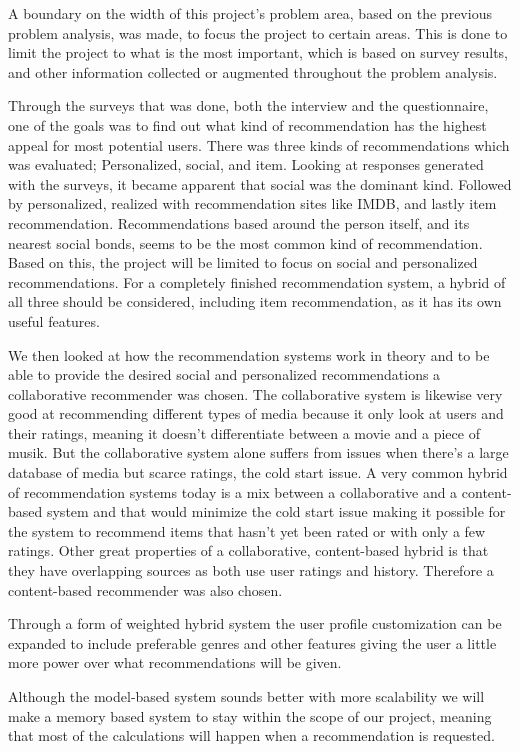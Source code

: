 A boundary on the width of this project's problem area, based on the previous problem analysis, was made, to focus the project to certain areas. This is done to limit the project to what is the most important, which is based on survey results, and other information collected or augmented throughout the problem analysis.

Through the surveys that was done, both the interview and the questionnaire, one of the goals was to find out what kind of recommendation has the highest appeal for most potential users. There was three kinds of recommendations which was evaluated; Personalized, social, and item. Looking at responses generated with the surveys, it became apparent that social was the dominant kind. Followed by personalized, realized with recommendation sites like IMDB, and lastly item recommendation. Recommendations based around the person itself, and its nearest social bonds, seems to be the most common kind of recommendation. Based on this, the project will be limited to focus on social and personalized recommendations. For a completely finished recommendation system, a hybrid of all three should be considered, including item recommendation, as it has its own useful features.

We then looked at how the recommendation systems work in theory and to be able to provide the desired social and personalized recommendations a collaborative recommender was chosen. The collaborative system is likewise very good at recommending different types of media because it only look at users and their ratings, meaning it doesn't differentiate between a movie and a piece of musik.  But the collaborative system alone suffers from issues when there's a large database of media but scarce ratings, the cold start issue. A very common hybrid of recommendation systems today is a mix between a collaborative and a content-based system and that would minimize the cold start issue making it possible for the system to recommend items that hasn't yet been rated or with only a few ratings. Other great properties of a collaborative, content-based hybrid is that they have overlapping sources as both use user ratings and history. Therefore a content-based recommender was also chosen. 

Through a form of weighted hybrid system the user profile customization can be expanded to include preferable genres and other features giving the user a little more power over what recommendations will be given. 

Although the model-based system sounds better with more scalability we will make a memory based system to stay within the scope of our project, meaning that most of the calculations will happen when a recommendation is requested.

